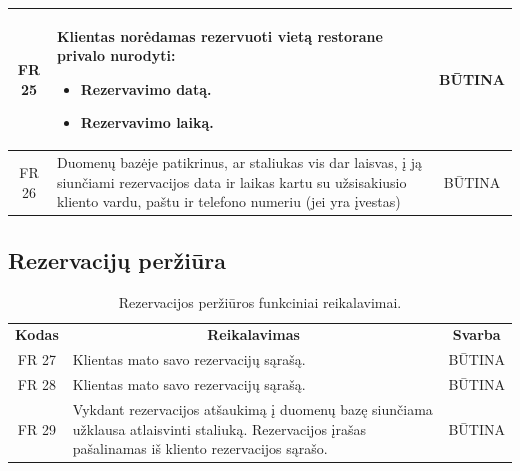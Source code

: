\documentclass{VUMIFPSkursinis}
\begin{document}
{{{{{\begin{center}
\begin{table}[H]
\begin{tabular}{|p{2cm}|p{}|p{}|}
		\multicolumn{1}{|c|}{FR 25}&
		{Klientas norėdamas rezervuoti vietą restorane privalo nurodyti:
			\begin{itemize}
				\item Rezervavimo datą.
				\item Rezervavimo laiką.
			\end{itemize}}&
			\multicolumn{1}{|c|}{BŪTINA}\\				
	\hline
	
		\multicolumn{1}{|c|}{FR 26}&
		{Duomenų bazėje patikrinus, ar staliukas vis dar laisvas, į ją siunčiami rezervacijos data ir laikas kartu su užsisakiusio kliento vardu, paštu ir telefono numeriu (jei yra įvestas)}&
		\multicolumn{1}{|c|}{BŪTINA}\\				
	\hline
	
			
	
	\end{tabular}		
	
	\label{table:StaliukoUžsakymas}
	\end{table}


\end{center}

\pagebreak

\subsection{Rezervacijų peržiūra}
\begin{center}
	\begin{table}[H]
	\caption{Rezervacijos peržiūros funkciniai reikalavimai.}
	\begin{tabular}{|p{2cm}|p{}|p{}|}
	
	\hline
	    \rowcolor{lightgray}
		\multicolumn{3}{|c|}{Rezervacijų priežiūra}\\
		
	\hline
		\multicolumn{1}{|c|}{{\bfseries Kodas}}&
		\multicolumn{1}{|c|}{{\bfseries Reikalavimas}}&
		\multicolumn{1}{|c|}{{\bfseries Svarba}}\\

	\hline
	
		\multicolumn{1}{|c|}{FR 27}&
		{Klientas mato savo rezervacijų sąrašą.}&
		\multicolumn{1}{|c|}{BŪTINA}\\				
	\hline
	
		\multicolumn{1}{|c|}{FR 28}&
		{Klientas mato savo rezervacijų sąrašą.}&
		\multicolumn{1}{|c|}{BŪTINA}\\				
	\hline
	
		\multicolumn{1}{|c|}{FR 29}&
		{Vykdant rezervacijos atšaukimą į duomenų bazę siunčiama užklausa atlaisvinti staliuką. Rezervacijos įrašas pašalinamas iš kliento rezervacijos sąrašo.}&
		\multicolumn{1}{|c|}{BŪTINA}\\				
	\hline
	

\end{tabular}
\end{table}
\end{center}}}}}}
\end{document}
